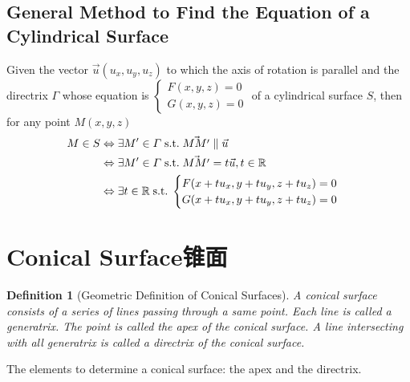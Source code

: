 \documentclass[onecolumn]{ctexart}
\newtheorem{definition}{Definition}
\begin{document}
\subsection{General Method to Find the Equation of a Cylindrical Surface}
Given the vector $\vec{u}(u_x, u_y, u_z)$ to which the axis of rotation is parallel and the directrix $\varGamma$ whose equation is $
\begin{cases}
  F(x, y, z) = 0 \\
  G(x, y, z) = 0
\end{cases}$ of a cylindrical surface $S$, then for any point $M(x, y, z)$
\begin{equation}
  \begin{split}
    M \in S &\Leftrightarrow \exists M' \in \varGamma \thickspace \textnormal{s.t.} \thickspace \vec{MM'} \parallel \vec{u} \\
            &\Leftrightarrow \exists M' \in \varGamma \thickspace \textnormal{s.t.} \thickspace \vec{MM'} = t\vec{u}, t \in \mathbb{R} \\
            &\Leftrightarrow \exists t \in \mathbb{R} \thickspace \textnormal{s.t.} \thickspace 
            \begin{cases}
              F(x + t u_x, y + t u_y, z + t u_z) = 0 \\
              G(x + t u_x, y + t u_y, z + t u_z) = 0
            \end{cases}
  \end{split}
\end{equation}

\section{Conical Surface锥面}

\begin{definition}[Geometric Definition of Conical Surfaces]
  A conical surface consists of a series of lines passing through a same point. 
  Each line is called a generatrix. The point is called the apex of the conical 
  surface. A line intersecting with all generatrix is called a directrix of the 
  conical surface.
\end{definition}

The elements to determine a conical surface: the apex and the directrix.
\end{document}
